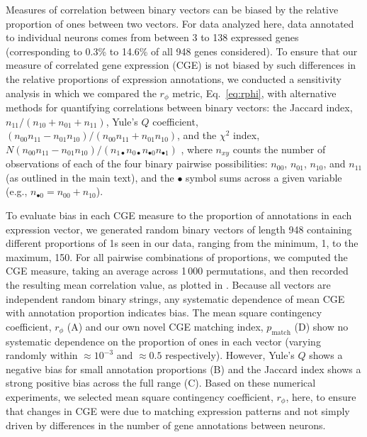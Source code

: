 \documentclass[10pt,letterpaper]{article}
\begin{document}
{Measures of correlation between binary vectors can be biased by the relative proportion of ones between two vectors.
For data analyzed here, data annotated to individual neurons comes from between 3 to 138 expressed genes (corresponding to 0.3\% to 14.6\% of all 948 genes considered).
To ensure that our measure of correlated gene expression (CGE) is not biased by such differences in the relative proportions of expression annotations, we conducted a sensitivity analysis in which we compared the $r_\phi$ metric, Eq.~\eqref{eq:rphi}, with alternative methods for quantifying correlations between binary vectors: the
Jaccard index, $n_{11}/(n_{10} + n_{01} + n_{11})$,
Yule's $Q$ coefficient, $(n_{00}n_{11} - n_{01}n_{10})/(n_{00}n_{11} + n_{01}n_{10})$,
and the $\chi^2$ index, $N (n_{00}n_{11} - n_{01}n_{10})/(n_{1\bullet}n_{0\bullet}n_{\bullet 0}n_{\bullet 1})$ \cite{Kaufman2006}, where $n_{xy}$ counts the number of observations of each of the four binary pairwise possibilities: $n_{00}$, $n_{01}$, $n_{10}$, and $n_{11}$ (as outlined in the main text), and the $\bullet$ symbol sums across a given variable (e.g., $n_{\bullet 0} = n_{00} + n_{10}$).

To evaluate bias in each CGE measure to the proportion of annotations in each expression vector, we generated random binary vectors of length 948 containing different proportions of 1s seen in our data, ranging from the minimum, 1, to the maximum, 150.
For all pairwise combinations of proportions, we computed the CGE measure, taking an average across 1\,000 permutations, and then recorded the resulting mean correlation value, as plotted in .
Because all vectors are independent random binary strings, any systematic dependence of mean CGE with annotation proportion indicates bias.
The mean square contingency coefficient, $r_\phi$ (A) and our own novel CGE matching index, $p_\mathrm{match}$ (D) show no systematic dependence on the proportion of ones in each vector (varying randomly within $\approx 10^{-3}$ and $\approx 0.5$ respectively).
However, Yule's $Q$ shows a negative bias for small annotation proportions (B) and the Jaccard index shows a strong positive bias across the full range (C).
Based on these numerical experiments, we selected mean square contingency coefficient, $r_\phi$, here, to ensure that changes in CGE were due to matching expression patterns and not simply driven by differences in the number of gene annotations between neurons.

}
\end{document}
